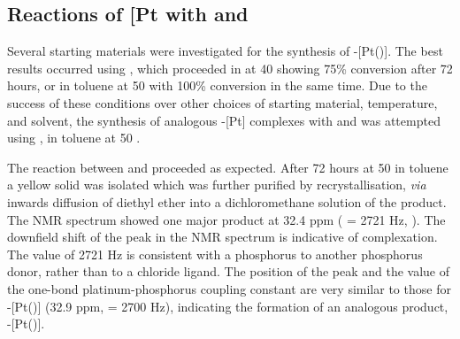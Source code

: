 
\subsection{Reactions of \texorpdfstring{[Pt\ce{(C6H10)Cl2}{]}} P with \tBusixantphos{} and \tBuxantphos{}}

Several starting materials were investigated for the synthesis of \trans-[Pt(\tButhixantphos)]. The best results occurred using \ce{[Pt(C6H10)Cl2]}, which proceeded in  at 40 \degC{} showing 75\% conversion after 72 hours, or in toluene at 50\degC{} with 100\% conversion in the same time.  Due to the success of these conditions over other choices of starting material, temperature, and solvent, the synthesis of analogous \trans-[Pt] complexes with \tBusixantphos{} and \tBuxantphos{} was attempted using \ce{[Pt(C6H10)Cl2]}, in toluene at 50 \degC{}.  

The reaction between \tBuxantphos{} and \ce{[Pt(C6H10)Cl2]} proceeded as expected.  After 72 hours at 50\degC{} in toluene a yellow solid was isolated which was further purified by recrystallisation, \emph{via} inwards diffusion of diethyl ether into a dichloromethane solution of the product.  The \phosphorus{} NMR spectrum showed one major product at 32.4 ppm (\JPtP{} = 2721 Hz, ).  The downfield shift of the peak in the \phosphorus{} NMR spectrum is indicative of complexation.   The value of 2721 Hz is consistent with a phosphorus \trans{} to another phosphorus donor, rather than \trans{} to a chloride ligand.\cite{Rigamonti2010, Appleton1978, Pregosin1980}  The position of the peak and the value of the one-bond platinum-phosphorus coupling constant are very similar to those for \trans-[Pt(\tButhixantphos)] (32.9 ppm, \JPtP{} = 2700 Hz), indicating the formation of an analogous product, \trans-[Pt(\tBuxantphos)].

